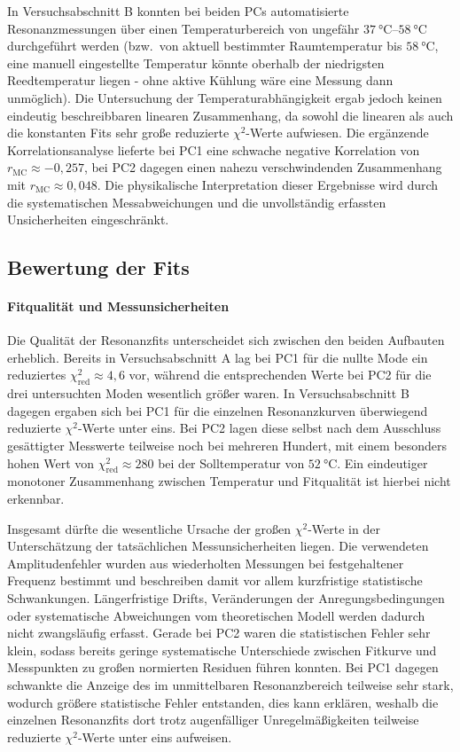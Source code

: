 \documentclass[11pt,a4paper]{article}
\begin{document}
In Versuchsabschnitt B konnten bei beiden PCs automatisierte Resonanzmessungen über einen Temperaturbereich von ungefähr $\qtyrange{37}{58}{\degreeCelsius}$ durchgeführt werden (bzw.\ von aktuell bestimmter Raumtemperatur bis \(\qty{58}{\degreeCelsius}\), eine manuell eingestellte Temperatur könnte oberhalb der niedrigsten Reedtemperatur liegen - ohne aktive Kühlung wäre eine Messung dann unmöglich). Die Untersuchung der Temperaturabhängigkeit ergab jedoch keinen eindeutig beschreibbaren linearen Zusammenhang, da sowohl die linearen als auch die konstanten Fits sehr große reduzierte $\chi^2$-Werte aufwiesen. Die ergänzende Korrelationsanalyse lieferte bei PC1 eine schwache negative Korrelation von $r_{\mathrm{MC}}\approx-0{,}257$, bei PC2 dagegen einen nahezu verschwindenden Zusammenhang mit $r_{\mathrm{MC}}\approx0{,}048$. Die physikalische Interpretation dieser Ergebnisse wird durch die systematischen Messabweichungen und die unvollständig erfassten Unsicherheiten eingeschränkt.


\subsection{Bewertung der Fits}

\paragraph{Fitqualität und Messunsicherheiten}
Die Qualität der Resonanzfits unterscheidet sich zwischen den beiden Aufbauten erheblich. Bereits in Versuchsabschnitt A lag bei PC1 für die nullte Mode ein reduziertes $\chi^2_{\mathrm{red}}\approx4{,}6$ vor, während die entsprechenden Werte bei PC2 für die drei untersuchten Moden wesentlich größer waren. In Versuchsabschnitt B dagegen ergaben sich bei PC1 für die einzelnen Resonanzkurven überwiegend reduzierte $\chi^2$-Werte unter eins. Bei PC2 lagen diese selbst nach dem Ausschluss gesättigter Messwerte teilweise noch bei mehreren Hundert, mit einem besonders hohen Wert von $\chi^2_{\mathrm{red}}\approx280$ bei der Solltemperatur von $\qty{52}{\degreeCelsius}$. Ein eindeutiger monotoner Zusammenhang zwischen Temperatur und Fitqualität ist hierbei nicht erkennbar.

Insgesamt dürfte die wesentliche Ursache der großen $\chi^2$-Werte in der Unterschätzung der tatsächlichen Messunsicherheiten liegen. Die verwendeten Amplitudenfehler wurden aus wiederholten Messungen bei festgehaltener Frequenz bestimmt und beschreiben damit vor allem kurzfristige statistische Schwankungen. Längerfristige Drifts, Veränderungen der Anregungsbedingungen oder systematische Abweichungen vom theoretischen Modell werden dadurch nicht zwangsläufig erfasst. Gerade bei PC2 waren die statistischen Fehler sehr klein, sodass bereits geringe systematische Unterschiede zwischen Fitkurve und Messpunkten zu großen normierten Residuen führen konnten.
Bei PC1 dagegen schwankte die Anzeige des im unmittelbaren Resonanzbereich teilweise sehr stark, wodurch größere statistische Fehler entstanden, dies kann erklären, weshalb die einzelnen Resonanzfits dort trotz augenfälliger Unregelmäßigkeiten teilweise reduzierte $\chi^2$-Werte unter eins aufweisen.
\end{document}
